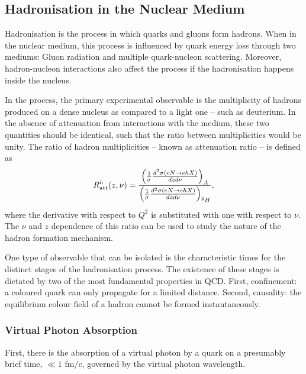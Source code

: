 \subsection{Hadronisation in the Nuclear Medium}
    Hadronisation is the process in which quarks and gluons form hadrons.
    When in the nuclear medium, this process is influenced by quark energy loss through two mediums: Gluon radiation and multiple quark-nucleon scattering.
    Moreover, hadron-nucleon interactions also affect the process if the hadronisation happens inside the nucleus.

    In the process, the primary experimental observable is the multiplicity of hadrons produced on a dense nucleus as compared to a light one -- such as deuterium.
    In the absence of attenuation from interactions with the medium, these two quantities should be identical, such that the ratio between multiplicities would be unity.
    The ratio of hadron multiplicities -- known as attenuation ratio -- is defined as
    \begin{equation*}
        R^h_{\text{att}}(z,\nu) = \frac
                {\left( \frac{1}{\sigma} \frac{d^2\sigma(eN \rightarrow ehX)}{dzd\nu} \right)_A}
                {\left( \frac{1}{\sigma} \frac{d^2\sigma(eN \rightarrow ehX)}{dzd\nu} \right)_{\prescript{2}{}{H}}},
    \end{equation*}
    where the derivative with respect to $Q^2$ is substituted with one with respect to $\nu$.
    The $\nu$ and $z$ dependence of this ratio can be used to study the nature of the hadron formation mechanism.

    One type of observable that can be isolated is the characteristic times for the distinct stages of the hadronisation process.
    The existence of these stages is dictated by two of the most fundamental properties in QCD.
    First, confinement: a coloured quark can only propagate for a limited distance.
    Second, causality: the equilibrium colour field of a hadron cannot be formed instantaneously.

    \subsubsection{Virtual Photon Absorption}
        First, there is the absorption of a virtual photon by a quark on a presumably brief time, $\ll 1 \text{ fm}/\text{c}$, governed by the virtual photon wavelength.

